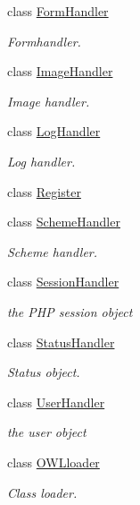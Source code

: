 \begin{DoxyCompactItemize}
class \hyperlink{classFormHandler}{FormHandler}
\begin{DoxyCompactList}\small\item\em Formhandler. \item\end{DoxyCompactList}\item 
class \hyperlink{classImageHandler}{ImageHandler}
\begin{DoxyCompactList}\small\item\em Image handler. \item\end{DoxyCompactList}\item 
class \hyperlink{classLogHandler}{LogHandler}
\begin{DoxyCompactList}\small\item\em Log handler. \item\end{DoxyCompactList}\item 
class \hyperlink{classRegister}{Register}
\item 
class \hyperlink{classSchemeHandler}{SchemeHandler}
\begin{DoxyCompactList}\small\item\em Scheme handler. \item\end{DoxyCompactList}\item 
class \hyperlink{classSessionHandler}{SessionHandler}
\begin{DoxyCompactList}\small\item\em the PHP session object \item\end{DoxyCompactList}\item 
class \hyperlink{classStatusHandler}{StatusHandler}
\begin{DoxyCompactList}\small\item\em Status object. \item\end{DoxyCompactList}\item 
class \hyperlink{classUserHandler}{UserHandler}
\begin{DoxyCompactList}\small\item\em the user object \item\end{DoxyCompactList}\item 
class \hyperlink{classOWLloader}{OWLloader}
\begin{DoxyCompactList}\small\item\em Class loader. \item\end{DoxyCompactList}\end{DoxyCompactItemize}

